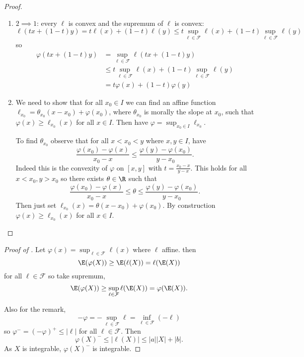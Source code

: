 \documentclass[a4paper]{article}
\begin{document}
\begin{proof}\leavevmode
  \begin{enumerate}
  \item \(2 \implies 1\): every \(\ell\) is convex and the supremum of \(\ell\) is convex:
    \[
      \ell(t x + (1 - t) y) = t \ell(x) + (1 - t) \ell(y) \leq t \sup_{\ell \in \mathcal F} \ell(x) + (1 - t) \sup_{\ell \in \mathcal F} \ell(y)
    \]
    so
    \begin{align*}
      \varphi(tx + (1 - t)y)
      &= \sup_{\ell \in \mathcal F} \ell( t x + (1 - t) y) \\
      &\leq t \sup_{\ell \in \mathcal F} \ell(x) + (1 - t) \sup_{\ell \in \mathcal F} \ell(y) \\
      &= t \varphi(x) + (1 - t) \varphi(y)
    \end{align*}
  \item We need to show that for all \(x_0 \in I\) we can find an affine function \(\ell_{x_0} = \theta_{x_0} (x - x_0) + \varphi(x_0)\), where \(\theta_{x_0}\) is morally the slope at \(x_0\), such that \(\varphi(x) \geq \ell_{x_0}(x)\) for all \(x \in I\). Then have \(\varphi = \sup_{x_0 \in I} \ell_{x_0}\).

    To find \(\theta_{x_0}\) observe that for all \(x < x_0 < y\) where \(x, y \in I\), have
    \[
      \frac{\varphi(x_0) - \varphi(x)}{x_0 - x} \leq \frac{\varphi(y) - \varphi(x_0)}{y - x_0}.
    \]
    Indeed this is the convexity of \(\varphi\) on \([x, y]\) with \(t = \frac{x_0 - x}{y - x}\). This holds for all \(x < x_0, y > x_0\) so there exists \(\theta \in \R\) such that
    \[
      \frac{\varphi(x_0) - \varphi(x)}{x_0 - x} \leq \theta \leq \frac{\varphi(y) - \varphi(x_0)}{y - x_0}.
    \]
    Then just set \(\ell_{x_0}(x) = \theta(x - x_0) + \varphi(x_0)\). By construction \(\varphi(x) \geq \ell_{x_0}(x)\) for all \(x \in I\).
  \end{enumerate}
\end{proof}

\begin{proof}[Proof of ]
  Let \(\varphi(x) = \sup_{\ell \in \mathcal F} \ell(x)\) where \(\ell\) affine. then
    \[
      \E(\varphi(X)) \geq \E(\ell(X)) = \ell(\E(X))
    \]
    for all \(\ell \in \mathcal F\) so take supremum,
    \[
      \E(\varphi(X)) \geq \sup_{\ell \in \mathcal F} \ell(\E(X)) = \varphi(\E(X)).
    \]

    Also for the remark,
    \[
      - \varphi = - \sup_{\ell \in \mathcal F} \ell = \inf_{\ell \in \mathcal F} (-\ell)
    \]
    so \(\varphi^- = (-\varphi)^+ \leq |\ell|\) for all \(\ell \in \mathcal F\). Then
    \[
      \varphi(X)^- \leq |\ell(X)| \leq |a| |X| + |b|.
    \]
    As \(X\) is integrable, \(\varphi(X)^-\) is integrable.
\end{proof}
\end{document}
